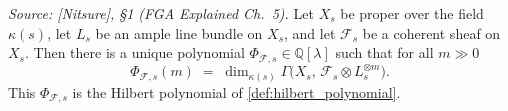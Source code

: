 \begin{theorem}
  \label{thm:hilbertPoly_of_sectionModule}
  \textit{Source: [Nitsure], \S 1 (FGA Explained Ch.~5).}
  Let \(X_s\) be proper over the field \(\kappa(s)\), let \(L_s\) be an ample line
  bundle on \(X_s\), and let \(\mathcal{F}_s\) be a coherent sheaf on \(X_s\).
  Then there is a unique polynomial \(\Phi_{\mathcal{F},s} \in \mathbb{Q}[\lambda]\)
  such that for all \(m \gg 0\)
  \[
    \Phi_{\mathcal{F},s}(m)
    \;=\; \dim_{\kappa(s)} \Gamma\bigl(X_s,\, \mathcal{F}_s \otimes L_s^{\otimes m}\bigr).
  \]
  This \(\Phi_{\mathcal{F},s}\) is the Hilbert polynomial of
  \cref{def:hilbert_polynomial}.
\end{theorem}

